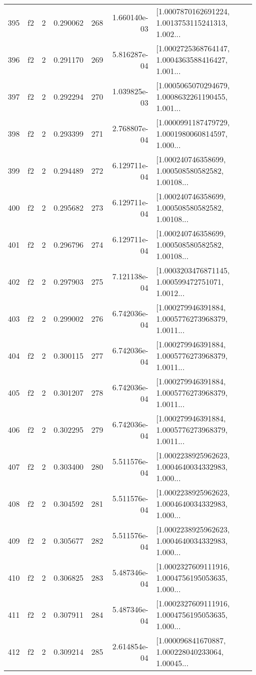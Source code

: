 \begin{tabular}{lllrlrl}
395 &  f2 &   2 &  0.290062 &  268 &  1.660140e-03 &  [1.0007870162691224, 1.0013753115241313, 1.002... \\
396 &  f2 &   2 &  0.291170 &  269 &  5.816287e-04 &  [1.0002725368764147, 1.0004363588416427, 1.001... \\
397 &  f2 &   2 &  0.292294 &  270 &  1.039825e-03 &  [1.0005065070294679, 1.0008632261190455, 1.001... \\
398 &  f2 &   2 &  0.293399 &  271 &  2.768807e-04 &  [1.0000991187479729, 1.0001980060814597, 1.000... \\
399 &  f2 &   2 &  0.294489 &  272 &  6.129711e-04 &  [1.000240746358699, 1.000508580582582, 1.00108... \\
400 &  f2 &   2 &  0.295682 &  273 &  6.129711e-04 &  [1.000240746358699, 1.000508580582582, 1.00108... \\
401 &  f2 &   2 &  0.296796 &  274 &  6.129711e-04 &  [1.000240746358699, 1.000508580582582, 1.00108... \\
402 &  f2 &   2 &  0.297903 &  275 &  7.121138e-04 &  [1.0003203476871145, 1.000599472751071, 1.0012... \\
403 &  f2 &   2 &  0.299002 &  276 &  6.742036e-04 &  [1.000279946391884, 1.0005776273968379, 1.0011... \\
404 &  f2 &   2 &  0.300115 &  277 &  6.742036e-04 &  [1.000279946391884, 1.0005776273968379, 1.0011... \\
405 &  f2 &   2 &  0.301207 &  278 &  6.742036e-04 &  [1.000279946391884, 1.0005776273968379, 1.0011... \\
406 &  f2 &   2 &  0.302295 &  279 &  6.742036e-04 &  [1.000279946391884, 1.0005776273968379, 1.0011... \\
407 &  f2 &   2 &  0.303400 &  280 &  5.511576e-04 &  [1.0002238925962623, 1.0004640034332983, 1.000... \\
408 &  f2 &   2 &  0.304592 &  281 &  5.511576e-04 &  [1.0002238925962623, 1.0004640034332983, 1.000... \\
409 &  f2 &   2 &  0.305677 &  282 &  5.511576e-04 &  [1.0002238925962623, 1.0004640034332983, 1.000... \\
410 &  f2 &   2 &  0.306825 &  283 &  5.487346e-04 &  [1.0002327609111916, 1.0004756195053635, 1.000... \\
411 &  f2 &   2 &  0.307911 &  284 &  5.487346e-04 &  [1.0002327609111916, 1.0004756195053635, 1.000... \\
412 &  f2 &   2 &  0.309214 &  285 &  2.614854e-04 &  [1.000096841670887, 1.000228040233064, 1.00045... \\

\end{tabular}
